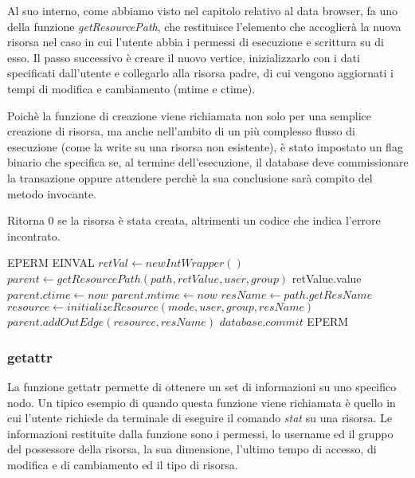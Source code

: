 Al suo interno, come abbiamo visto nel capitolo relativo al data browser, fa uno della funzione \emph{getResourcePath}, che restituisce l'elemento che accoglierà la nuova risorsa nel caso in cui l'utente abbia i permessi di esecuzione e scrittura su di esso. Il passo successivo è creare il nuovo vertice, inizializzarlo con i dati specificati dall'utente e collegarlo alla risorsa padre, di cui vengono aggiornati i tempi di modifica e cambiamento (mtime e ctime).

Poichè la funzione di creazione viene richiamata non solo per una semplice creazione di risorsa, ma anche nell'ambito di un più complesso flusso di esecuzione (come la write su una risorsa non esistente), è stato impostato un flag binario che specifica se, al termine dell'esecuzione, il database deve commissionare la transazione oppure attendere perchè la sua conclusione sarà compito del metodo invocante.
\begin{algorithm}
\begin{algorithmic}
\caption{Ritorna 0 se la risorsa è stata creata, altrimenti un codice che indica l'errore incontrato.}
		\State \Return EPERM
	\EndIf
		\State \Return EINVAL
	\EndIf
	\State $retVal \gets new IntWrapper()$
	\State $parent \gets getResourcePath(path, retValue, user, group)$
		\State \Return retValue.value
	\EndIf
		\State $parent.ctime \gets now$
		\State $parent.mtime \gets now$
		\State $resName \gets path.getResName$
		\State $resource \gets initializeResource(mode, user, group, resName)$
		\State $parent.addOutEdge(resource, resName)$
			\State $database.commit$
		\EndIf
	\Else
		\State \Return EPERM
	\EndIf
\EndFunction
\end{algorithmic}
\end{algorithm}

\subsubsection{getattr}
La funzione gettatr permette di ottenere un set di informazioni su uno specifico nodo. Un tipico esempio di quando questa funzione viene richiamata è quello in cui l'utente richiede da terminale di eseguire il comando \emph{stat} su una risorsa. Le informazioni restituite dalla funzione sono i permessi, lo username ed il gruppo del possessore della risorsa, la sua dimensione, l'ultimo tempo di accesso, di modifica e di cambiamento ed il tipo di risorsa.

